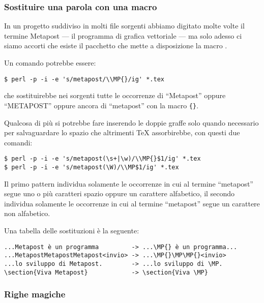 \subsubsection{Sostituire una parola con una macro}

In un progetto suddiviso in molti file sorgenti abbiamo digitato molte volte il
termine Metapost --- il programma di grafica vettoriale --- ma solo adesso ci
siamo accorti che esiste il pacchetto  che mette a
disposizione la macro .

Un comando potrebbe essere:
\begin{verbatim}
$ perl -p -i -e 's/metapost/\\MP{}/ig' *.tex
\end{verbatim}
che sostituirebbe nei sorgenti tutte le occorrenze di ``Metapost'' oppure
``METAPOST'' oppure ancora di ``metapost'' con la macro \texttt{\{\}}.

Qualcosa di più si potrebbe fare inserendo le doppie graffe solo quando
necessario per salvaguardare lo spazio che altrimenti \TeX{} assorbirebbe, con
questi due comandi:
\begin{verbatim}
$ perl -p -i -e 's/metapost(\s+|\w)/\\MP{}$1/ig' *.tex
$ perl -p -i -e 's/metapost(\W)/\\MP$1/ig' *.tex
\end{verbatim}

Il primo pattern individua solamente le occorrenze in cui al termine
``metapost'' segue uno o più caratteri spazio oppure un carattere alfabetico, il
secondo individua solamente le occorrenze in cui al termine ``metapost'' segue
un carattere non alfabetico.

Una tabella delle sostituzioni è la seguente:
\begin{Verbatim}[fontsize=\small]
...Metapost è un programma         -> ...\MP{} è un programma...
...MetapostMetapostMetapost<invio> -> ...\MP{}\MP\MP{}<invio>
...lo sviluppo di Metapost.        -> ...lo sviluppo di \MP.
\section{Viva Metapost}            -> \section{Viva \MP}
\end{Verbatim}

\subsubsection{Righe magiche}

